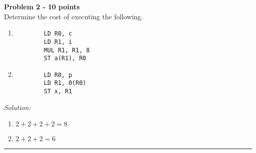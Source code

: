\documentclass[a4paper, 11pt]{article}
\newenvironment{problem}[2][Problem]
    { \begin{mdframed}[backgroundcolor=gray!20] \textbf{#1 #2} \\}
    {  \end{mdframed}}
\newenvironment{solution}
    {\textit{Solution:}}
    {}
\begin{document}
\begin{problem}{2 - 10 points}
Determine the cost of executing the following.
\begin{enumerate}
    \item \begin{verbatim}
        LD R0, c  
        LD R1, i  
        MUL R1, R1, 8  
        ST a(R1), R0  
    \end{verbatim}
    \item \begin{verbatim}
        LD R0, p  
        LD R1, 0(R0) 
        ST x, R1  
    \end{verbatim}
\end{enumerate}
\end{problem}
\begin{solution}
    \begin{enumerate}
        \item $2 + 2 + 2 + 2 = 8$
        \item $2 + 2 + 2 = 6$
    \end{enumerate}
\end{solution}

\noindent\rule{7in}{2.8pt}

\end{document}
